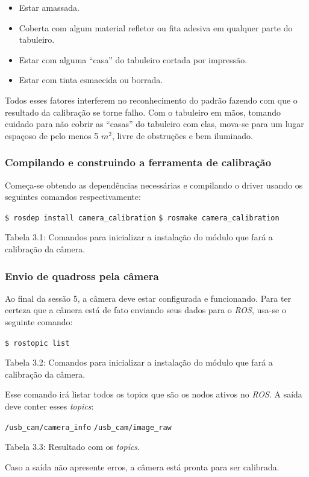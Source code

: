 \begin{itemize}
	\item{Estar amassada.}
	\item{Coberta com algum material refletor ou fita adesiva em qualquer parte do tabuleiro.}
	\item{Estar com alguma “casa” do tabuleiro cortada por impressão.}
	\item{Estar com tinta esmaecida ou borrada.}
\end{itemize}	

Todos esses fatores interferem no reconhecimento do padrão fazendo com que o resultado da calibração se torne falho. Com o tabuleiro em mãos, tomando cuidado para não cobrir as “casas” do tabuleiro com elas, mova-se para um lugar espaçoso de pelo menos 5 $m^2$, livre de obstruções e bem iluminado.

\subsubsection{Compilando e construindo a ferramenta de calibração}

Começa-se obtendo as dependências necessárias e compilando o driver usando os seguintes comandos respectivamente:

\texttt{\$ rosdep install camera\_calibration}
\texttt{\$ rosmake camera\_calibration}

Tabela 3.1: Comandos para inicializar a instalação do módulo que fará a calibração da câmera.

\subsubsection{Envio de quadross pela câmera}

Ao final da sessão 5, a câmera deve estar configurada e funcionando. Para ter certeza que a câmera está de fato enviando seus dados para o \textit{ROS}, usa-se o seguinte comando:

\texttt{\$ rostopic list}

Tabela 3.2: Comandos para inicializar a instalação do módulo que fará a calibração da câmera.

Esse comando irá listar todos os topics que são os nodos ativos no \textit{ROS}. A saída deve conter esses \textit{topics}:

\texttt{/usb\_cam/camera\_info}
\texttt{/usb\_cam/image\_raw}

Tabela 3.3: Resultado com os \textit{topics}.

Caso a saída não apresente erros, a câmera está pronta para ser calibrada.

